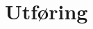 \documentclass[main.tex]{subfiles}
\begin{document}
\section{Utf\o ring}
\label{sec:4}
\end{document}
